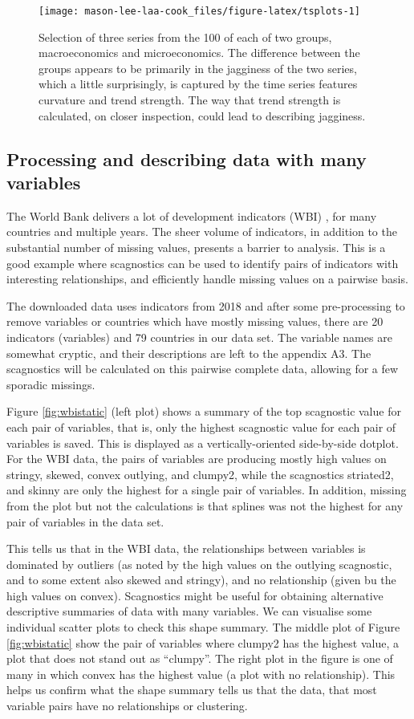 \begin{figure}
\texttt{[image: mason-lee-laa-cook\_files/figure-latex/tsplots-1]} \caption{Selection of three series from the 100 of each of two groups, macroeconomics and microeconomics. The difference between the groups appears to be primarily in the jagginess of the two series, which a little surprisingly, is captured by the time series features curvature and trend strength. The way that trend strength is calculated, on closer inspection, could lead to describing jagginess.}\label{fig:tsplots}
\end{figure}

\subsection{Processing and describing data with many variables}\label{processing-and-describing-data-with-many-variables}

The World Bank delivers a lot of development indicators (WBI) \citep{WBI}, for many countries and multiple years. The sheer volume of indicators, in addition to the substantial number of missing values, presents a barrier to analysis. This is a good example where scagnostics can be used to identify pairs of indicators with interesting relationships, and efficiently handle missing values on a pairwise basis.

The downloaded data uses indicators from 2018 and after some pre-processing to remove variables or countries which have mostly missing values, there are 20 indicators (variables) and 79 countries in our data set. The variable names are somewhat cryptic, and their descriptions are left to the appendix A3. The scagnostics will be calculated on this pairwise complete data, allowing for a few sporadic missings.

Figure \ref{fig:wbistatic} (left plot) shows a summary of the top scagnostic value for each pair of variables, that is, only the highest scagnostic value for each pair of variables is saved. This is displayed as a vertically-oriented side-by-side dotplot. For the WBI data, the pairs of variables are producing mostly high values on stringy, skewed, convex outlying, and clumpy2, while the scagnostics striated2, and skinny are only the highest for a single pair of variables. In addition, missing from the plot but not the calculations is that splines was not the highest for any pair of variables in the data set.

This tells us that in the WBI data, the relationships between variables is dominated by outliers (as noted by the high values on the outlying scagnostic, and to some extent also skewed and stringy), and no relationship (given bu the high values on convex). Scagnostics might be useful for obtaining alternative descriptive summaries of data with many variables. We can visualise some individual scatter plots to check this shape summary. The middle plot of Figure \ref{fig:wbistatic} show the pair of variables where clumpy2 has the highest value, a plot that does not stand out as ``clumpy''. The right plot in the figure is one of many in which convex has the highest value (a plot with no relationship). This helps us confirm what the shape summary tells us that the data, that most variable pairs have no relationships or clustering.

